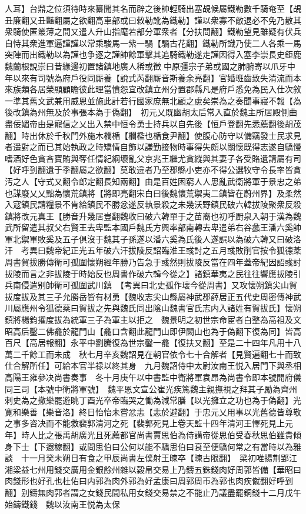 人耳】台鼎之位須待時來纂聞其名而辟之後帥輕騎出塞覘候屬鐵勒數千騎奄至【覘丑廉翻又丑豔翻屬之欲翻高車部或曰敕勒訛為鐵勒】謹以衆寡不敵退必不免乃散其衆騎使匿叢薄之間又遣人升山指麾若部分軍衆者【分扶問翻】鐵勒望見雖疑有伏兵自恃其衆進軍逼謹謹以常乘駿馬一紫一騧【騧古花翻】鐵勒所識乃使二人各乘一馬突陣而出鐵勒以為謹也争逐之謹帥餘軍擊其追騎鐵勒遂走謹因得入塞李崇長史鉅鹿魏蘭根說崇曰昔緣邊初置諸鎮地廣人稀或徵中原彊宗子弟或國之肺腑寄以爪牙中年以來有司號為府戶役同厮養【說式芮翻厮音斯養余亮翻】官婚班齒致失清流而本來族類各居榮顯顧瞻彼此理當憤怨宜改鎮立州分置郡縣凡是府戶悉免為民入仕次敘一準其舊文武兼用威恩並施此計若行國家庶無北顧之慮矣崇為之奏聞事寢不報【為後改鎮為州無及於事張本為于偽翻】　初元乂既幽胡太后常入直於魏主所居殿側曲盡佞媚帝由是寵信之乂出入禁中恒令勇士持兵以自先後【恒戶登翻先悉薦翻後胡茂翻】時出休於千秋門外施木欄楯【欄檻也楯食尹翻】使腹心防守以備竊發士民求見者遥對之而已其始執政之時矯情自飾以謙勤接物時事得失頗以關懷既得志遂自驕慢嗜酒好色貪吝寶賄與奪任情紀綱壞亂父京兆王繼尤貪縱與其妻子各受賂遺請屬有司【好呼到翻遺于季翻屬之欲翻】莫敢違者乃至郡縣小吏亦不得公選牧守令長率皆貪汚之人【守式又翻令郎定翻長知兩翻】由是百姓困窮人人思亂武衛將軍于景忠之弟也謀廢乂乂黜為懷荒鎮將【將即亮翻宋白曰後魏懷荒禦夷二鎮皆在蔚州界】及柔然入寇鎮民請糧景不肯給鎮民不勝忿遂反執景殺之未幾沃野鎮民破六韓拔陵聚衆反殺鎮將改元真王【勝音升幾居豈翻魏收曰破六韓單于之苗裔也初呼㕑泉入朝于漢為魏武所留遣其叔父右賢王去卑監本國戶魏氏方興率部南轉去卑遣弟右谷蠡王潘六奚帥軍北禦軍敗奚及五子俱沒于魏其子孫遂以潘六奚為氏後人遂誤以為破六韓又曰破洛汗　考異曰魏帝紀正光五年破六汗拔陵反詔臨淮王彧討之五月彧敗削官按令狐德棻周書賀拔勝傳衛可孤圍懷朔經年勝乃告急于彧然則拔陵反當在四年蓋帝紀因詔彧討拔陵而言之非拔陵于時始反也周書作破六韓今從之】諸鎮華夷之民往往響應拔陵引兵南侵遣别帥衛可孤圍武川鎮　【考異曰北史孤作瓌今從周書】又攻懷朔鎮尖山賀拔度拔及其三子允勝岳皆有材勇【魏收志尖山縣屬神武郡薛居正五代史周密傳神武川屬應州令狐德棻曰賀拔之先與魏氏同出隂山魏書官氏志内入諸姓有賀拔氏】懷朔鎮將楊鈞擢度拔為統軍三子為軍主以拒之　魏景明之初世宗命宦者白整為高祖及文昭高后鑿二佛龕於龍門山【龕口含翻此龍門山即伊闕山也為于偽翻下復為同】皆高百尺【高居報翻】永平中劉騰復為世宗鑿一龕【復扶又翻】至是二十四年凡用十八萬二千餘工而未成　秋七月辛亥魏詔見在朝官依令七十合解者【見賢遍翻七十而致仕合解所任】可給本官半禄以終其身　九月魏詔侍中太尉汝南王悦入居門下與丞相高陽王雍參决尚書奏事　冬十月庚午以中書監中衛將軍袁昂為尚書令即本號開府儀同三司【本號中衛將軍號】　魏平恩文宣公崔光疾篤魏主親撫視之拜其子勵為齊州刺史為之撤樂罷遊眺丁酉光卒帝臨哭之慟為減常膳【以光擁立之功也為于偽翻】光寛和樂善【樂音洛】終日怡怡未嘗忿恚【恚於避翻】于忠元乂用事以光舊德皆尊敬之事多咨决而不能救裴郭清河之死【裴郭死見上卷天監十四年清河王懌死見上元年】時人比之張禹胡廣光且死薦都官尚書賈思伯為侍講帝從思伯受春秋思伯雖貴傾身下士【下遐稼翻】或問思伯曰公何以能不驕思伯曰衰至便驕何常之有當時以為雅談　十一月癸未朔日有食之甲辰尚書左僕射王暕卒【暕古限翻】　梁初唯揚荆郢江湘梁益七州用錢交廣用金銀餘州雜以穀帛交易上乃鑄五銖錢肉好周郭皆備【華昭曰肉錢形也好孔也杜佑曰内郭為肉外郭為好孟康曰周郭周帀為郭也肉疾僦翻好呼到翻】别鑄無肉郭者謂之女錢民間私用女錢交易禁之不能止乃議盡罷銅錢十二月戊午始鑄鐵錢　魏以汝南王悦為太保

